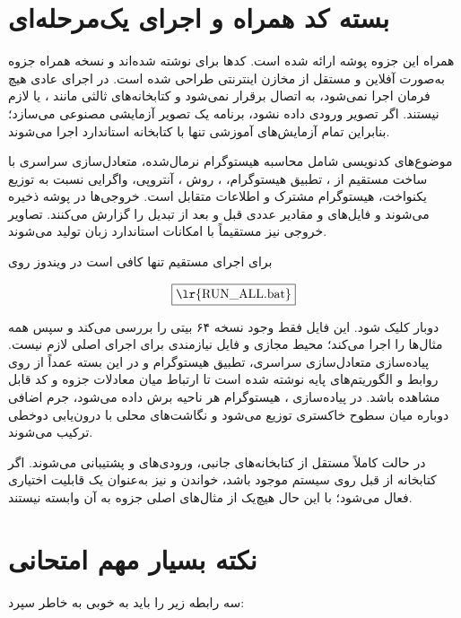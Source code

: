 \documentclass[12pt,a4paper]{article}
\begin{document}
\section{بسته کد همراه و اجرای یک‌مرحله‌ای}

همراه این جزوه پوشه  ارائه شده است. کدها برای  نوشته شده‌اند
و نسخه همراه جزوه به‌صورت آفلاین و مستقل از مخازن اینترنتی طراحی شده است. در اجرای
عادی هیچ فرمان  اجرا نمی‌شود، به  اتصال برقرار نمی‌شود و
کتابخانه‌های ثالثی مانند ،  یا  لازم نیستند.
اگر تصویر ورودی داده نشود، برنامه یک تصویر آزمایشی مصنوعی می‌سازد؛ بنابراین تمام
آزمایش‌های آموزشی تنها با کتابخانه استاندارد  اجرا می‌شوند.

موضوع‌های کدنویسی شامل محاسبه هیستوگرام نرمال‌شده، متعادل‌سازی سراسری با ساخت مستقیم
 از ، تطبیق هیستوگرام، ، روش ، آنتروپی،
واگرایی  نسبت به توزیع یکنواخت، هیستوگرام مشترک و اطلاعات متقابل است. خروجی‌ها
در پوشه  ذخیره می‌شوند و فایل‌های  و  مقادیر
عددی قبل و بعد از تبدیل را گزارش می‌کنند. تصاویر خروجی  نیز مستقیماً با
امکانات استاندارد زبان تولید می‌شوند.

برای اجرای مستقیم تنها کافی است در ویندوز روی

\[
\boxed{\text{\lr{RUN\_ALL.bat}}}
\]

دوبار کلیک شود. این فایل فقط وجود نسخه ۶۴ بیتی  را بررسی می‌کند و سپس
همه مثال‌ها را اجرا می‌کند؛ محیط مجازی و فایل نیازمندی برای اجرای اصلی لازم نیست.
پیاده‌سازی متعادل‌سازی سراسری، تطبیق هیستوگرام و  در این بسته عمداً از روی
روابط و الگوریتم‌های پایه نوشته شده است تا ارتباط میان معادلات جزوه و کد قابل مشاهده
باشد. در پیاده‌سازی ، هیستوگرام هر ناحیه برش داده می‌شود، جرم اضافی دوباره
میان سطوح خاکستری توزیع می‌شود و نگاشت‌های محلی با درون‌یابی دوخطی ترکیب می‌شوند.

در حالت کاملاً مستقل از کتابخانه‌های جانبی، ورودی‌های  و  پشتیبانی
می‌شوند. اگر کتابخانه  از قبل روی سیستم موجود باشد، خواندن  و
 نیز به‌عنوان یک قابلیت اختیاری فعال می‌شود؛ با این حال هیچ‌یک از مثال‌های
اصلی جزوه به آن وابسته نیستند.


\section{نکته بسیار مهم امتحانی}
	
	سه رابطه زیر را باید به خوبی به خاطر سپرد:
	
\end{document}
